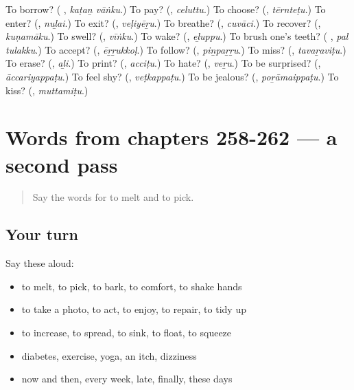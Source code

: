 \begin{tcolorbox}[breakable,colback=teal!4,colframe=teal!35!black,title={Before you move on}]
To borrow? (\textbf{ }, \emph{kaṭaṉ vāṅku}.) To pay? (\textbf{}, \emph{celuttu}.) To choose? (\textbf{}, \emph{tērnteṭu}.) To enter? (\textbf{}, \emph{nuḻai}.) To exit? (\textbf{}, \emph{veḷiyēṟu}.) To breathe? (\textbf{}, \emph{cuvāci}.) To recover? (\textbf{}, \emph{kuṇamāku}.) To swell? (\textbf{}, \emph{vīṅku}.) To wake? (\textbf{}, \emph{eḻuppu}.) To brush one's teeth? (\textbf{ }, \emph{pal tulakku}.) To accept? (\textbf{}, \emph{ēṟṟukkoḷ}.) To follow? (\textbf{}, \emph{piṉpaṟṟu}.) To miss? (\textbf{}, \emph{tavaṟaviṭu}.) To erase? (\textbf{}, \emph{aḻi}.) To print? (\textbf{}, \emph{acciṭu}.) To hate? (\textbf{}, \emph{veṟu}.) To be surprised? (\textbf{}, \emph{āccariyappaṭu}.) To feel shy? (\textbf{}, \emph{veṭkappaṭu}.) To be jealous? (\textbf{}, \emph{poṟāmaippaṭu}.) To kiss? (\textbf{}, \emph{muttamiṭu}.)
\end{tcolorbox}
\section[(dialogue)]{Words from chapters 258-262 — a second pass}

\label{lesson:TA-R262-second-pass-words-from-chapters-258-262}



\begin{quote}
Say the words for to melt and to pick.
\end{quote}

\subsection*{Your turn}
Say these aloud:

\begin{itemize}
\raggedright
  \item to melt, to pick, to bark, to comfort, to shake hands
  \item to take a photo, to act, to enjoy, to repair, to tidy up
  \item to increase, to spread, to sink, to float, to squeeze
  \item diabetes, exercise, yoga, an itch, dizziness
  \item now and then, every week, late, finally, these days
\end{itemize}

